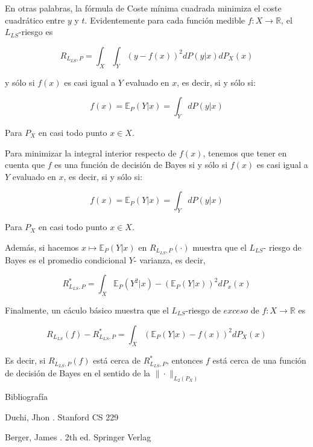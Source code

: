 \documentclass[utf8,spanish,xcolor={table,dvipsnames},12pt]{beamer}
\begin{document}
\begin{frame}
En otras palabras, la fórmula de Coste mínima cuadrada minimiza el  coste cuadrático entre $y$ y $t$. Evidentemente para cada función medible $f:X\rightarrow\mathds{R}$, el $L_{LS}$-riesgo es

$$R_{L_{LS},P}=\int_{X}\int_{Y}(y-f(x))^{2}dP(y|x)dP_{X}(x)$$

\vspace{0.2cm}

y sólo si $f(x)$ es casi igual a $Y$ evaluado en $x$, es decir, si y sólo si:

$$f(x)=\mathds{E}_{P}(Y|x)=\int_{Y}dP(y|x)$$

Para $P_{X}$ en casi todo punto $x\in X$.
\end{frame}


\begin{frame}
Para minimizar la integral interior respecto de $f(x)$, tenemos que tener en cuenta que $f$ es una función de decisión de Bayes si y sólo si $f(x)$ es casi igual a $Y$ evaluado en $x$, es decir, si y sólo si:

$$f(x)=\mathds{E}_{P}(Y|x)=\int_{Y}dP(y|x)$$

Para $P_{X}$ en casi todo punto $x\in X$.

\vspace{0.2cm}

Además, si hacemos $x\mapsto \mathds{E}_{P}(Y|x)$ en $R_{L_{LS},P}(\cdot)$ muestra que el $L_{LS}$- riesgo de Bayes es el promedio condicional $Y$- varianza, es decir,

$$R^{\ast}_{L_{LS},P}=\int_{X}\mathds{E}_{P}(Y^{2}|x)-(\mathds{E}_{P}(Y|x))^{2}dP_{x}(x)$$
\end{frame}


\begin{frame}
Finalmente, un cáculo básico muestra que el $L_{LS}$-riesgo de $\textit{exceso}$ de $f:X\rightarrow\mathds{R}$ es

$$R_{L_{LS}}(f)-R^{\ast}_{L_{LS},P}=\int_{X}(\mathds{E}_{P}(Y|x)-f(x))^{2}dP_{X}(x)$$

Es decir, si $R_{L_{LS},P}(f)$ está cerca de $R^{\ast}_{L_{LS},P}$, entonces $f$ está cerca de una función de decisión de Bayes en el sentido de la $\|\cdot\|_{L_{2}(P_{X})}$
\end{frame}


\begin{frame}{Bibliografía}
\begin{thebibliography}{9}

Duchi, Jhon
.
\newblock Stanford CS 229


Berger, James
. 2th ed.
\newblock Springer Verlag
\end{thebibliography}
\end{frame}
\end{document}
